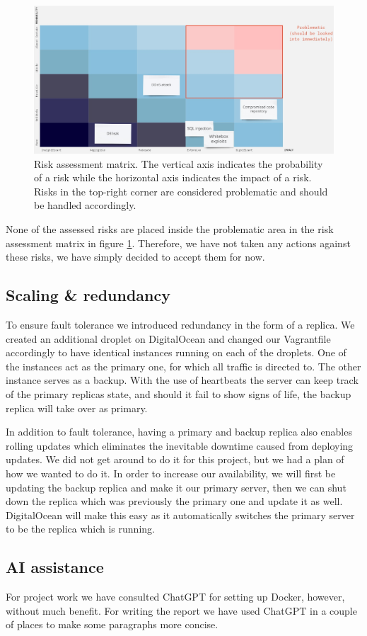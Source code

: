 \begin{figure}[H]
    \centering
    \includegraphics[width=\textwidth]{images/risk_matrix.png}
    \caption{Risk assessment matrix. The vertical axis indicates the probability of a risk while the horizontal axis indicates the impact of a risk. Risks in the top-right corner are considered problematic and should be handled accordingly.}
    \label{fig:risk_matrix}
\end{figure}

None of the assessed risks are placed inside the problematic area in the risk assessment matrix in figure \ref{fig:risk_matrix}. Therefore, we have not taken any actions against these risks, we have simply decided to accept them for now.

\subsection{Scaling \& redundancy} \label{sec:scaling}
To ensure fault tolerance we introduced redundancy in the form of a replica. We created an additional droplet on DigitalOcean and changed our Vagrantfile accordingly to have identical instances running on each of the droplets. One of the instances act as the primary one, for which all traffic is directed to. The other instance serves as a backup. With the use of heartbeats the server can keep track of the primary replicas state, and should it fail to show signs of life, the backup replica will take over as primary.

In addition to fault tolerance, having a primary and backup replica also enables rolling updates which eliminates the inevitable downtime caused from deploying updates. We did not get around to do it for this project, but we had a plan of how we wanted to do it. In order to increase our availability, we will first be updating the backup replica and make it our primary server, then we can shut down the replica which was previously the primary one and update it as well. DigitalOcean will make this easy as it automatically switches the primary server to be the replica which is running.

\subsection{AI assistance}
For project work we have consulted ChatGPT for setting up Docker, however, without much benefit. For writing the report we have used ChatGPT in a couple of places to make some paragraphs more concise.